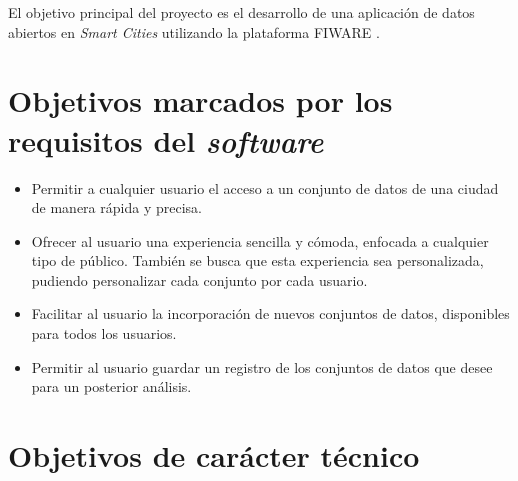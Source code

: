 \begin{comment}
Este apartado explica de forma precisa y concisa cuales son los objetivos que se persiguen con la realización del proyecto. Se puede distinguir entre los objetivos marcados por los requisitos del software a construir y los objetivos de carácter técnico que plantea a la hora de llevar a la práctica el proyecto.
\end{comment}

El objetivo principal del proyecto es el desarrollo de una aplicación de datos abiertos en \textit{Smart Cities} utilizando la plataforma FIWARE \cite{fiware}. 

\section{Objetivos marcados por los requisitos del \textit{software}}\label{objetivos-generales}

\begin{itemize}
\tightlist
\item
  Permitir a cualquier usuario el acceso a un conjunto de datos de una ciudad de manera rápida y precisa.
\item
  Ofrecer al usuario una experiencia sencilla y cómoda, enfocada a cualquier tipo de público. También se busca que esta experiencia sea personalizada, pudiendo personalizar cada conjunto por cada usuario.
\item
  Facilitar al usuario la incorporación de nuevos conjuntos de datos, disponibles para todos los usuarios.
\item
  Permitir al usuario guardar un registro de los conjuntos de datos que desee para un posterior análisis.
\end{itemize}



\section{Objetivos de carácter técnico}\label{objetivos-personales}

